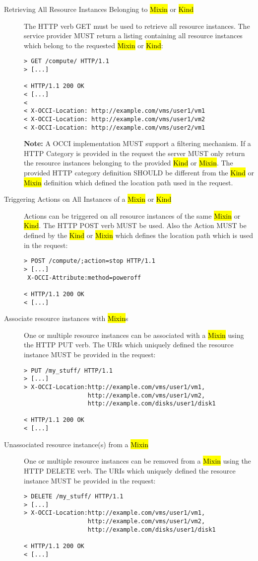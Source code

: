 \documentclass[10pt,a4paper]{article}
\begin{document}
\begin{description}
\item[Retrieving All Resource Instances Belonging to \hl{Mixin} or
  \hl{Kind}] The HTTP verb GET must be used to retrieve all resource
  instances. The service provider MUST return a listing containing
  all resource instances which belong to the requested \hl{Mixin} or
  \hl{Kind}:
\begin{verbatim}
> GET /compute/ HTTP/1.1
> [...]
 
< HTTP/1.1 200 OK
< [...]
< 
< X-OCCI-Location: http://example.com/vms/user1/vm1
< X-OCCI-Location: http://example.com/vms/user1/vm2
< X-OCCI-Location: http://example.com/vms/user2/vm1
\end{verbatim}
\textbf{Note:} A OCCI implementation MUST support a filtering
mechanism. If a HTTP Category is provided in the request the server
MUST only return the resource instances belonging to the provided
\hl{Kind} or \hl{Mixin}. The provided HTTP category definition SHOULD
be different from the \hl{Kind} or \hl{Mixin} definition which defined
the location path used in the request.

\item[Triggering Actions on All Instances of a \hl{Mixin} or
  \hl{Kind}] Actions can be triggered on all resource instances of the
  same \hl{Mixin} or \hl{Kind}. The HTTP POST verb MUST be used. Also
  the Action MUST be defined by the \hl{Kind} or \hl{Mixin} which
  defines the location path which is used in the request:
\begin{verbatim}
> POST /compute/;action=stop HTTP/1.1
> [...]
 X-OCCI-Attribute:method=poweroff

< HTTP/1.1 200 OK
< [...]
\end{verbatim}

\item[Associate resource instances with \hl{Mixin}s] One
  or multiple resource instances can be associated with a \hl{Mixin}
  using the HTTP PUT verb. The URIs which uniquely defined the
  resource instance MUST be provided in the request:
\begin{verbatim}
> PUT /my_stuff/ HTTP/1.1
> [...]
> X-OCCI-Location:http://example.com/vms/user1/vm1,
                  http://example.com/vms/user1/vm2,
                  http://example.com/disks/user1/disk1

< HTTP/1.1 200 OK
< [...]
\end{verbatim}

\item[Unassociated resource instance(s) from a \hl{Mixin}] One or multiple
  resource instances can be removed from a \hl{Mixin} using the HTTP
  DELETE verb. The URIs which uniquely defined the resource instance
  MUST be provided in the request:
\begin{verbatim}
> DELETE /my_stuff/ HTTP/1.1
> [...]
> X-OCCI-Location:http://example.com/vms/user1/vm1,
                  http://example.com/vms/user1/vm2,
                  http://example.com/disks/user1/disk1

< HTTP/1.1 200 OK
< [...]
\end{verbatim}
\end{description}
\end{document}
